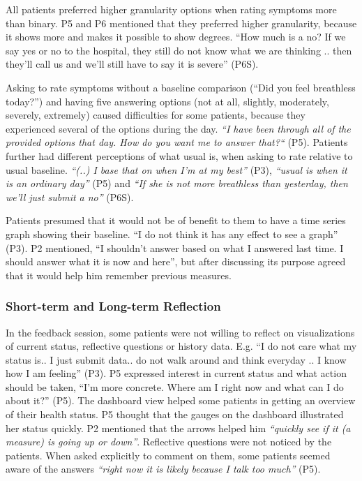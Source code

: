 All patients preferred higher granularity options when rating symptoms more than binary. P5 and P6 mentioned that they preferred higher granularity, because it shows more and makes it possible to show degrees. “How much is a no? If we say yes or no to the hospital, they still do not know what we are thinking .. then they’ll call us and we’ll still have to say it is severe” (P6S). 

Asking to rate symptoms without a baseline comparison (“Did you feel breathless today?”) and having five answering options (not at all, slightly, moderately, severely, extremely) caused difficulties for some patients, because they experienced several of the options during the day. \textit{“I have been through all of the provided options that day. How do you want me to answer that?“} (P5). Patients further had different perceptions of what usual is, when asking to rate relative to usual baseline. \textit{“(..) I base that on when I’m at my best”} (P3), \textit{“usual is when it is an ordinary day”} (P5) and \textit{“If she is not more breathless than yesterday, then we’ll just submit a no”} (P6S). 

Patients presumed that it would not be of benefit to them to have a time series graph showing their baseline. “I do not think it has any effect to see a graph” (P3). P2 mentioned, “I shouldn’t answer based on what I answered last time. I should answer what it is now and here”, but after discussing its purpose agreed that it would help him remember previous measures. 

\subsubsection{Short-term and Long-term Reflection}
In the feedback session, some patients were not willing to reflect on visualizations of current status, reflective questions or history data. E.g. “I do not care what my status is.. I just submit data.. do not walk around and think everyday .. I know how I am feeling” (P3). P5 expressed interest in current status and what action should be taken, “I’m more concrete. Where am I right now and what can I do about it?” (P5). The dashboard view helped some patients in getting an overview of their health status. P5 thought that the gauges on the dashboard illustrated her status quickly. P2 mentioned that the arrows helped him \textit{“quickly see if it (a measure) is going up or down”}. Reflective questions were not noticed by the patients. When asked explicitly to comment on them, some patients seemed aware of the answers \textit{“right now it is likely because I talk too much”} (P5). 

